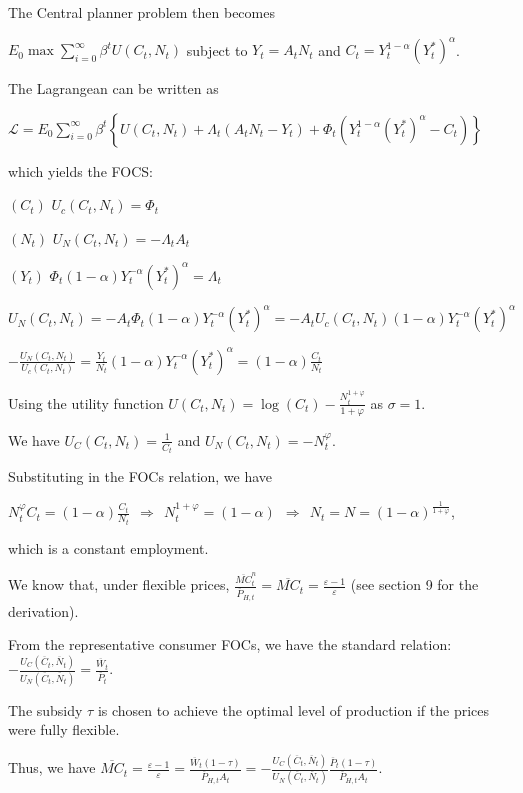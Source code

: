 \documentclass[
]{article}
\begin{document}
The Central planner problem then becomes

\(\displaystyle E_0\max \sum_{i=0}^\infty \beta^t U(C_t,N_t)\) subject
to \(Y_t=A_tN_t\) and \(C_t=Y_t^{1-\alpha}(Y_t^*)^\alpha\).

The Lagrangean can be written as

\(\displaystyle \mathcal{L}= E_0 \sum_{i=0}^\infty \beta^t \left\{ U(C_t,N_t) +\Lambda_t(A_t N_t - Y_t) + \Phi_t \left( Y_t^{1-\alpha}(Y_t^*)^\alpha -C_t \right) \right\}\)

which yields the FOCS:

\((C_t)\) \(U_c(C_t,N_t)=\Phi_t\)

\((N_t)\) \(U_N(C_t,N_t)=-\Lambda_t A_t\)

\((Y_t)\) \(\Phi_t (1-\alpha)Y_t^{-\alpha}(Y_t^*)^\alpha =\Lambda_t\)

\(U_N(C_t,N_t) = -A_t \Phi_t (1-\alpha)Y_t^{-\alpha}(Y_t^*)^\alpha = -A_t U_c(C_t,N_t) (1-\alpha)Y_t^{-\alpha}(Y_t^*)^\alpha\)

\(\displaystyle -\frac{U_N(C_t,N_t)}{U_c(C_t,N_t)} = \frac{Y_t}{N_t} (1-\alpha)Y_t^{-\alpha}(Y_t^*)^\alpha=(1-\alpha) \frac{C_t}{N_t}\)

Using the utility function
\(\displaystyle U(C_t,N_t)=\log(C_t)-\frac{N_t^{1+\varphi}}{1+\varphi}\)
as \(\sigma=1\).

We have \(\displaystyle U_C(C_t,N_t)=\frac{1}{C_t}\) and
\(\displaystyle U_N(C_t,N_t)=-N_t^\varphi\).

Substituting in the FOCs relation, we have

\(\displaystyle N_t^\varphi C_t=(1-\alpha)\frac{C_t}{N_t} \ \ \Rightarrow \ \ N_t^{1+\varphi}=(1-\alpha) \ \ \Rightarrow \ \ N_t = N = (1-\alpha)^{\frac{1}{1+\varphi}}\),

which is a constant employment.

We know that, under flexible prices,
\(\displaystyle \frac{\overline{MC}_t^n}{\overline{P}_{H,t}}=\overline{MC}_t=\frac{\varepsilon-1}{\varepsilon}\)
(see section 9 for the derivation).

From the representative consumer FOCs, we have the standard relation:
\(\displaystyle -\frac{U_C(\overline{C}_t,\overline{N}_t)}{U_N(\overline{C}_t,\overline{N}_t)}=\frac{\overline{W}_t}{\overline{P}_t}\).

The subsidy \(\tau\) is chosen to achieve the optimal level of
production if the prices were fully flexible.

Thus, we have
\(\displaystyle \overline{MC}_t=\frac{\varepsilon-1}{\varepsilon}=\frac{\overline{W}_t (1-\tau)}{\overline{P}_{H,t} A_t}=-\frac{U_C(\overline{C}_t,\overline{N}_t)}{U_N(\overline{C}_t,\overline{N}_t)}\frac{\overline{P}_t (1-\tau)}{\overline{P}_{H,t} A_t}\).
\end{document}
